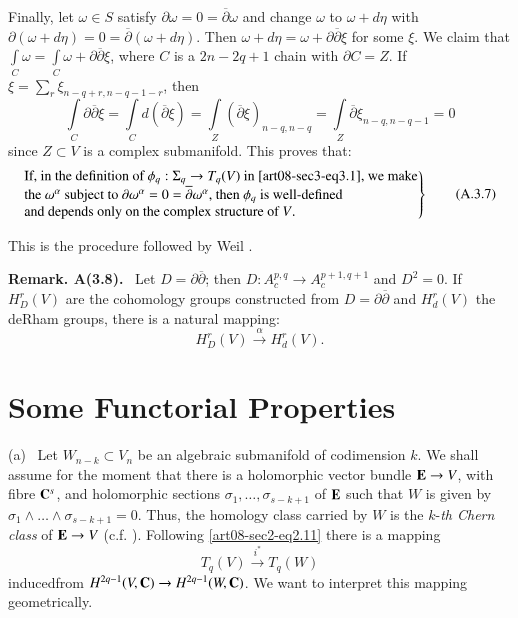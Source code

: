 Finally, let $\omega\in S$ satisfy $\partial \omega=0=\overline{\partial}\omega$ and change $\omega$ to $\omega+d\eta$ with $\partial(\omega+d\eta)=0=\overline{\partial}(\omega+d\eta)$. Then $\omega+d\eta=\omega+\partial\overline{\partial}\xi$ for some $\xi$. We claim that $\int\limits_{C}\omega=\int\limits_{C}\omega+\partial\overline{\partial}\xi$, where $C$ is a $2n-2q+1$ chain with $\partial C=Z$. If $\xi=\sum\limits_{r}\xi_{n-q+r,n-q-1-r}$, then
$$
\int\limits_{C}\partial\overline{\partial}\xi=\int\limits_{C}d(\overline{\partial}\xi)=\int\limits_{Z}(\overline{\partial}\xi)_{n-q,n-q}=\int\limits_{Z}\overline{\partial}\xi_{n-q,n-q-1}=0
$$
since $Z\subset V$ is a complex submanifold. This proves that:
\begin{equation*}
\left.
\begin{array}{@{}l@{}}
\text{If, in the definition of  $\phi_{q}:\Sigma_{q}\to T_{q}(V)$  in \eqref{art08-sec3-eq3.1}, we make}\\
\text{the $\omega^{\alpha}$ subject to $\partial\omega^{\alpha}=0=\overline{\partial}\omega^{\alpha}$, then $\phi_{q}$ is well-defined}\\
\text{and depends only on the complex structure of $V$.}
\end{array}
\right\}\tag{A.3.7}\label{art08-sec3-eqA3.7}
\end{equation*}

This is the procedure followed by Weil \cite{art08-key22}.

\medskip
\noindent
{\bf Remark. A(3.8).}~ Let $D=\partial\overline{\partial}$; then $D:A^{p,q}_{c}\to A^{p+1,q+1}_{c}$ and $D^{2}=0$. If $H^{r}_{D}(V)$ are the cohomology groups constructed from $D=\partial\overline{\partial}$ and $H^{r}_{d}(V)$ the deRham groups, there is a natural mapping:
\begin{equation*}
H^{r}_{D}(V)\xrightarrow{\alpha}H^{r}_{d}(V).\tag{A3.9}\label{art08-sec3-eqA3.9}
\end{equation*}

\section{Some Functorial Properties}\label{art08-sec4}
(a)~ Let $W_{n-k}\subset V_{n}$ be an algebraic submanifold of codimension $k$. We shall assume for the moment that there is a holomorphic vector bundle $\mathbf{E}\to V$, with fibre $\mathbf{C}^{s}$, and holomorphic sections $\sigma_{1},\ldots,\sigma_{s-k+1}$ of $\mathbf{E}$ such that $W$ is given by $\sigma_{1}\wedge\ldots\wedge \sigma_{s-k+1}=0$. Thus, the homology class carried by $W$ is the $k$-{\em th Chern class} of $\mathbf{E}\to V$ (c.f. \cite{art08-key5}). Following \eqref{art08-sec2-eq2.11} there is a mapping
\setcounter{equation}{0}
\begin{equation}
T_{q}(V)\xrightarrow{i^{*}}T_{q}(W)\label{art08-sec4-eq4.1}
\end{equation}
induced\pageoriginale from $H^{2q-1}(V,\mathbf{C})\to H^{2q-1}(W,\mathbf{C})$. We want to interpret this mapping geometrically.

